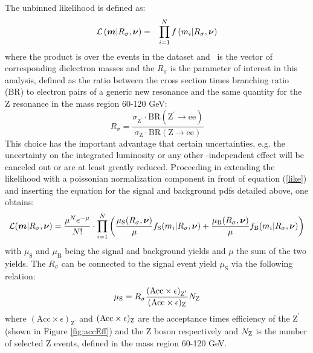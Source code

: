 The unbinned likelihood is defined as:
\begin{eqnarray}
\label{like}
 \mathcal{L}\left( {\boldsymbol m} \vert R_\sigma, {\boldsymbol\nu} \right) & = & \prod_{i=1}^{N} f\left(m_i \vert R_\sigma, {\boldsymbol\nu} \right)
\end{eqnarray}
where the product is over the events in the dataset and \bm\ is the vector of corresponding dielectron masses and the $R_\sigma$ is the parameter of interest in this analysis, defined as the ratio between the cross section times branching ratio (BR) to electron pairs of a generic new resonance and the same quantity for the Z resonance in the mass region 60-120 GeV:
\begin{equation}
R_{\sigma}=\frac{\sigma_{\mathrm{Z^{'}}}\cdot\mathrm{BR(Z^{'}\rightarrow ee)}}{\sigma_{\mathrm{Z}}\cdot\mathrm{BR(Z\rightarrow ee)}}
\end{equation}
This choice has the important advantage that certain uncertainties, e.g. the uncertainty on the integrated luminosity or any other \ET-independent effect will be canceled out or are at least greatly reduced.
Proceeding in extending the likelihood with a poissonian normalization component in front of equation (\ref{like}) and inserting the equation for the signal and background pdfs detailed above, one obtains:
\begin{equation}
\mathcal{L}({\boldsymbol m}|R_\sigma,{\boldsymbol\nu}) =
  \frac{\mu^Ne^{-\mu}}{N!} \cdot
    \prod_{i=1}^{N}
      \left(
        \frac{\mu_\mathrm{S}(R_\sigma,{\boldsymbol\nu})}{\mu}f_\mathrm{S}(m_i|R_\sigma,{\boldsymbol\nu})
        + \frac{\mu_\mathrm{B}(R_\sigma,{\boldsymbol\nu})}{\mu}f_\mathrm{B}(m_i|R_\sigma,{\boldsymbol\nu})
      \right)
      \label{eq:ext_likelihood}
\end{equation}
with $\mu_{\mathrm{S}}$ and $\mu_{\mathrm{B}}$ being the signal and background yields and $\mu$ the sum of the two yields.
The $R_{\sigma}$ can be connected to the signal event yield $\mu_{\mathrm{S}}$ via the following relation:
\begin{equation}
\label{eq:musig}
\mu_{\mathrm{S}} = R_\sigma \frac{(\mathrm{Acc}\times\epsilon)_{\mathrm{Z}^{'}}}{(\mathrm{Acc}\times\epsilon)_{\mathrm{Z}}} N_{\mathrm{Z}}
\end{equation}
where $(\mathrm{Acc}\times\epsilon)_{\mathrm{Z}^{'}}$ and $(\mathrm{Acc}\times\epsilon)_{\mathrm{Z}}$ are the acceptance times efficiency of the $\mathrm{Z^{'}}$ (shown in Figure \ref{fig:accEff}) and the Z boson respectively and $N_{\mathrm{Z}}$ is the number of selected Z events, defined in the mass region 60-120 GeV.



